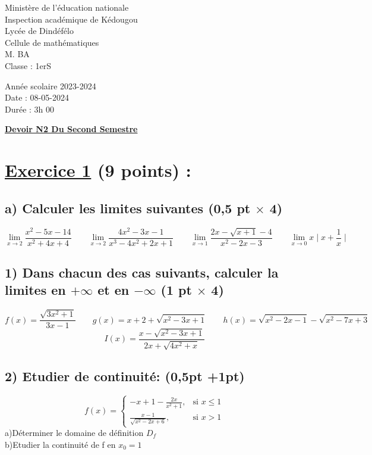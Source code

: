 \documentclass{article}
\begin{document}
\begin{minipage}{0.7\textwidth}
	Ministère de l'éducation nationale  \\
	Inspection académique de Kédougou   \\
	Lycée de Dindéfélo            \\
	Cellule de mathématiques            \\
	M. BA                          \\
	Classe : 1erS  \\
\end{minipage}
\begin{minipage}{0.5\textwidth}
	Année scolaire 2023-2024 \\
	Date : 08-05-2024 \\
	Durée : 3h 00 \\
\end{minipage}

\begin{center}
	\textbf{{\underline{Devoir N2 Du Second Semestre}}}
\end{center}

\section*{\underline{Exercice 1} (9 points) :}
\subsection*{a) Calculer les limites suivantes (0,5 pt $\times$ 4)}
\[ \lim_{x \to 2}\frac{x^{2}-5x-14}{x^{2}+4x+4}\quad\quad 
\lim_{x \to 2}\frac{4x^{2}-3x-1}{x^{3}-4x^{2}+2x+1}\quad\quad 
\lim_{x \to 1}\frac{2x-\sqrt{x+1}-4}{x^{2}-2x-3}\quad\quad 
\lim_{x \to 0}x\mid x+\frac{1}{x}\mid\]
\subsection*{1) Dans chacun des cas suivants, calculer la limites en $+\infty$ et en $-\infty$ (1 pt $\times$ 4)}
\[ f(x)=\frac{\sqrt{3x^{2}+1}}{3x-1}\quad\quad 
g(x)=x+2+\sqrt{x^{2}-3x+1}\quad\quad 
h(x)=\sqrt{x^{2}-2x-1}-\sqrt{x^{2}-7x+3} \]
\[I(x)=\frac{x-\sqrt{x^{2}-3x+1}}{2x+\sqrt{4x^{2}+x}} \]
\subsection*{2) Etudier de continuité: (0,5pt +1pt)}
\[ f(x) = \begin{cases} 
  -x+1-\frac{2x}{x^{2}+1}, & \text{si } x \leq 1 \\
  \frac{x-1}{\sqrt{x^{2}-2x+6}}, & \text{si } x > 1
\end{cases} \]
a)Déterminer le domaine de définition $D_{f}$\\
b)Etudier la continuité de f en $x_{0}=1$
\end{document}
